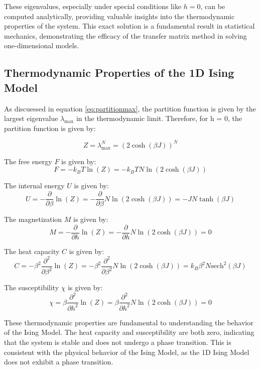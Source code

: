 These eigenvalues, especially under special conditions like \( h = 0 \), can be
computed analytically, providing valuable insights into the thermodynamic
properties of the system. This exact solution is a fundamental result in
statistical mechanics, demonstrating the efficacy of the transfer matrix method
in solving one-dimensional models.

\subsection{Thermodynamic Properties of the 1D Ising Model}

As discuessed in equation \ref{eq:partitionmax}, the partition function is given
by the largest eigenvalue \( \lambda_{\text{max}} \) in the thermodynamic limit.
Therefore, for h = 0, the partition function is given by:

\begin{equation}
Z = \lambda_{\text{max}}^N = (2 \cosh(\beta J))^N
\label{eq:partitionh0}
\end{equation}

The free energy \( F \) is given by:
\begin{equation}
F = -k_B T \ln(Z) = -k_B T N \ln(2 \cosh(\beta J))
\end{equation}

The internal energy \( U \) is given by:
\begin{equation}
U = - \frac{\partial}{\partial \beta} \ln(Z) = - \frac{\partial}{\partial \beta} N \ln(2 \cosh(\beta J)) = -JN \tanh(\beta J)
\end{equation}

The magnetization \( M \) is given by:
\begin{equation}
M = - \frac{\partial}{\partial h} \ln(Z) = - \frac{\partial}{\partial h} N \ln(2 \cosh(\beta J)) = 0
\end{equation}

The heat capacity \( C \) is given by:
\begin{equation}
C = - \beta^2 \frac{\partial^2}{\partial \beta^2} \ln(Z) = - \beta^2 \frac{\partial^2}{\partial \beta^2} N \ln(2 \cosh(\beta J)) = k_B \beta^2 N \text{sech}^2(\beta J)
\end{equation}

The susceptibility \( \chi \) is given by:
\begin{equation}
\chi = \beta \frac{\partial^2}{\partial h^2} \ln(Z) = \beta \frac{\partial^2}{\partial h^2} N \ln(2 \cosh(\beta J)) = 0
\end{equation}

These thermodynamic properties are fundamental to understanding the behavior of
the Ising Model. The heat capacity and susceptibility are both zero, indicating
that the system is stable and does not undergo a phase transition. This is
consistent with the physical behavior of the Ising Model, as the 1D Ising Model
does not exhibit a phase transition.
